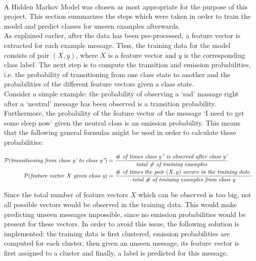 
 \\

A Hidden Markov Model was chosen as most appropriate for the purpose of this project. This section summarizes the steps which were taken in order to train the model and predict classes for unseen examples afterwards. \\

\noindent As explained earlier, after the data has been pre-processed, a feature vector is extracted for each example message. Thus, the training data for the model consists of pair $(X, y)$, where $X$ is a feature vector and $y$ is the corresponding class label. The next step is to compute the transition and emission probabilities, i.e. the probability of transitioning from one class state to another and the probabilities of the different feature vectors given a class state. \\

\noindent  Consider a simple example: the probability of observing a `sad' massage right after a `neutral' message has been observed is a transition probability. Furthermore, the probability of the feature vector of the message `I need to get some sleep now' given the neutral class is an emission probability. This means that the following general formulas might be used in order to calculate these probabilities:

\begin{align*}
\cal{P} (\textit{transitioning from class y' to class y''}) 
&= \frac {\# \textit{ of times class y'' is observed after class y'}} {\textit {total \# of training examples}} \\
\cal{P} (\textit{feature vector $X$ given class y}) 
&= \frac {\# \textit{ of times the pair $(X, y)$ occurs in the training data }} {\textit {total \# of training examples from class y}} \\
\end{align*}

\noindent Since the total number of feature vectors $X$ which can be observed is too big, not all possible vectors would be observed in the training data. This would make predicting unseen messages impossible, since no emission probabilities would be present for these vectors. In order to avoid this issue, the following solution is implemented: the training data is first clustered, emission probabilities are computed for each cluster, then given an unseen message, its feature vector is first assigned to a cluster and finally, a label is predicted for this message. 
